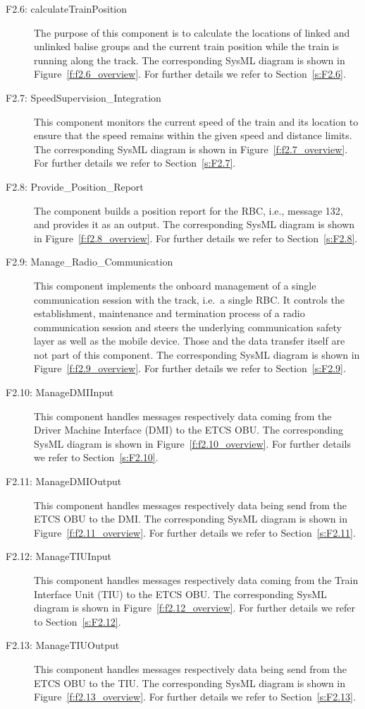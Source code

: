 \begin{description}
\item[F2.6: calculateTrainPosition] The purpose of this component is to calculate the locations of linked and unlinked balise groups and the current train position while the train is running along the track. The corresponding SysML diagram is shown in Figure~\ref{f:f2.6_overview}. For further details we refer to Section~\ref{s:F2.6}.


\item[F2.7: SpeedSupervision\_Integration] This component monitors the current speed of the train and its location to ensure that the speed remains within the given speed and distance limits. The corresponding SysML diagram is shown in Figure~\ref{f:f2.7_overview}. For further details we refer to Section~\ref{s:F2.7}.


\item[F2.8: Provide\_Position\_Report] The component builds a position report for the RBC, i.e., message 132, and provides it as an output. The corresponding SysML diagram is shown in Figure~\ref{f:f2.8_overview}. For further details we refer to Section~\ref{s:F2.8}.


\item[F2.9: Manage\_Radio\_Communication] This component implements the onboard management of a single communication session with the track, i.e.~a single RBC. It controls the establishment, maintenance and termination process of a radio communication session and steers the underlying communication safety layer as well as the mobile device. Those and the data transfer itself are not part of this component. The corresponding SysML diagram is shown in Figure~\ref{f:f2.9_overview}. For further details we refer to Section~\ref{s:F2.9}.


\item[F2.10: ManageDMIInput] This component handles messages respectively data coming from the Driver Machine Interface (DMI) to the ETCS OBU. The corresponding SysML diagram is shown in Figure~\ref{f:f2.10_overview}. For further details we refer to Section~\ref{s:F2.10}.


\item[F2.11: ManageDMIOutput] This component handles messages respectively data being send from the ETCS OBU to the DMI. The corresponding SysML diagram is shown in Figure~\ref{f:f2.11_overview}. For further details we refer to Section~\ref{s:F2.11}.


\item[F2.12: ManageTIUInput] This component handles messages respectively data coming from the Train Interface Unit (TIU) to the ETCS OBU. The corresponding SysML diagram is shown in Figure~\ref{f:f2.12_overview}. For further details we refer to Section~\ref{s:F2.12}.


\item[F2.13: ManageTIUOutput] This component handles messages respectively data being send from the ETCS OBU to the TIU. The corresponding SysML diagram is shown in Figure~\ref{f:f2.13_overview}. For further details we refer to Section~\ref{s:F2.13}.
\end{description}

